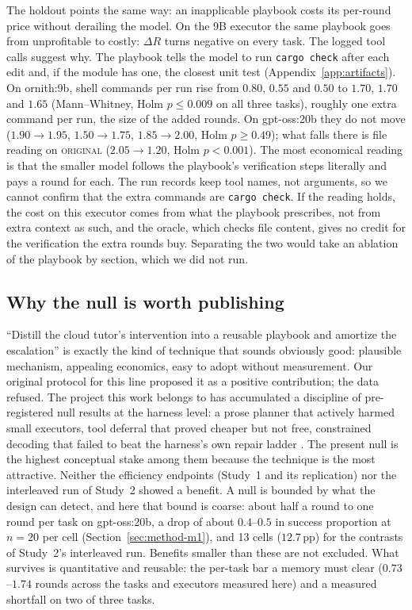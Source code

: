 \documentclass[smallcondensed,natbib]{svjour3}
\begin{document}
The holdout points the same way: an inapplicable playbook costs its
per-round price without derailing the model. On the 9B executor the
same playbook goes from unprofitable to costly: $\Delta R$ turns
negative on every task. The logged tool calls suggest why. The
playbook tells the model to run \texttt{cargo check} after each edit
and, if the module has one, the closest unit test
(Appendix~\ref{app:artifacts}). On
ornith:9b, shell commands per run rise from $0.80$, $0.55$ and $0.50$
to $1.70$, $1.70$ and $1.65$ (Mann--Whitney, Holm $p\leq0.009$ on all
three tasks), roughly one extra command per run, the size of the
added rounds. On gpt-oss:20b they do not move ($1.90\to1.95$,
$1.50\to1.75$, $1.85\to2.00$, Holm $p\geq0.49$); what falls there is
file reading on \textsc{original} ($2.05\to1.20$, Holm $p<0.001$).
The most economical reading is that the smaller model follows the
playbook's verification steps literally and pays a round for each.
The run records keep tool names, not arguments, so we cannot confirm
that the extra commands are \texttt{cargo check}. If the reading
holds, the cost on this executor comes from what the playbook
prescribes, not from extra context as such, and the oracle, which
checks file content, gives no credit for the verification the extra
rounds buy. Separating the two would take an ablation of the
playbook by section, which we did not run.

\subsection{Why the null is worth publishing}\label{sec:disc-null}

``Distill the cloud tutor's intervention into a reusable playbook and
amortize the escalation'' is exactly the kind of technique that sounds
obviously good: plausible mechanism, appealing economics, easy to
adopt without measurement. Our original protocol for this line
proposed it as a positive contribution; the data refused. The project
this work belongs to has accumulated a discipline of pre-registered
null results at the harness level: a prose planner that actively
harmed small executors, tool deferral that proved cheaper but not
free, constrained decoding that failed to beat the harness's own
repair ladder \citep{parra2026scaffolding}. The present null is the highest
conceptual stake among them because the technique is the most
attractive. Neither the efficiency endpoints (Study~1 and its
replication) nor the interleaved run of Study~2 showed a benefit. A
null is bounded by what the design can detect, and here that bound is
coarse: about half a round to one round per task on gpt-oss:20b, a
drop of about $0.4$--$0.5$ in success proportion at $n=20$ per cell
(Section~\ref{sec:method-m1}), and 13 cells ($12.7$\,pp) for the
contrasts of Study~2's interleaved run. Benefits smaller than these are not
excluded. What
survives is quantitative and reusable: the per-task bar a memory must
clear ($0.73$--$1.74$ rounds across the tasks and executors measured
here) and a measured shortfall on two of three tasks.
\end{document}
